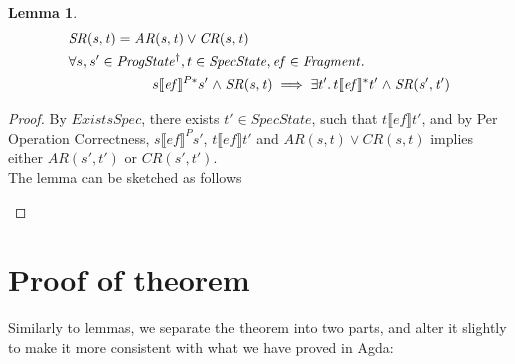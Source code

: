 \documentclass[letterpaper,twocolumn,10pt]{article}
\newtheorem{lemma}[theorem]{Lemma}
\theoremstyle{definition}
\newcommand{\conj}{\mathrel\land}
\renewcommand{\i}[1]{\ensuremath{\mathit{#1}}}
\begin{document}
\begin{lemma}\label{lemma-1}
	\begin{align*}
		&\i{SR(s, t)} = \i{AR(s, t)} \lor \i{CR(s, t)}\\
		&\forall s, s' \in \i{ProgState^\dagger}, t \in \i{SpecState}, \i{ef} \in \i{Fragment} \ldotp\\
		&\qquad \qquad \qquad s \llbracket \i{ef} \rrbracket^{P*} s'  \conj \i{SR(s, t)} \implies \exists t' \ldotp t\llbracket \i{ef} \rrbracket^* t' \conj \i{SR(s', t')} \\
	\end{align*}
\end{lemma}
\begin{proof}
	By $\i{ExistsSpec}$, there exists $t' \in SpecState$, such that $t \llbracket \i{ef} \rrbracket t'$, and by Per Operation Correctness, $s \llbracket \i{ef} \rrbracket^P s'$, $t \llbracket \i{ef} \rrbracket t'$ and $\i{AR(s, t)} \lor \i{CR(s, t)}$ implies either $\i{AR(s', t')}$ or $\i{CR(s', t')}$. \\
	The lemma can be sketched as follows
	\begin{figure} [h] \centering
{}
	\end{figure}
\end{proof}

\section{Proof of theorem}

Similarly to lemmas, we separate the theorem into two parts, and alter it slightly to make it more consistent with what we have proved in Agda:
\end{document}
